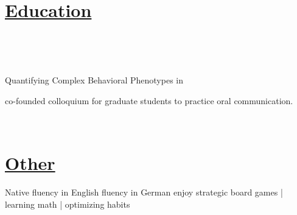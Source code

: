 \documentclass[]{winter-resume-openfont}
\begin{document}
\begin{minipage}[t]{0.65\textwidth}
\sectionsep



\section{\underline{Education}}

 \\
\sectionsep

 \\

\begin{tightemize}
\item {} Quantifying Complex Behavioral Phenotypes in 

\item co-founded colloquium for graduate students to practice oral communication.
\end{tightemize}

\sectionsep

 \\
\sectionsep

\section{\underline{Other}}
Native fluency in English \textbullet{} fluency in German \textbullet{} enjoy strategic board games | learning math | optimizing habits




\end{minipage} 
\hfill
\end{document}
